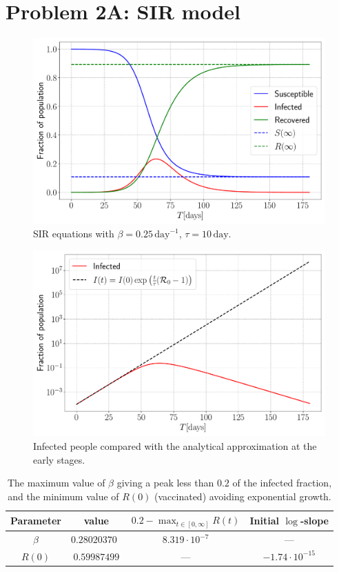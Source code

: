 \section{Problem 2A: SIR model}

\begin{figure}[htb]
	\centering
	\includegraphics[width=0.8\columnwidth]{../fig/2Aa_SIR.pdf}
	\caption{SIR equations with $\beta = 0.25 \, \mathrm{day}^{-1}$, $\tau = 10 \, \mathrm{day}$.}
	\label{fig:SIR}
\end{figure}

\begin{figure}[htb]
	\centering
	\includegraphics[width=0.8\columnwidth]{../fig/2Ab_I.pdf}
	\caption{Infected people compared with the analytical approximation at the early stages.}
	\label{fig:Infected}
\end{figure}



\begin{table}[htb]
	\centering
	\caption{The maximum value of $\beta$ giving a peak less than $0.2$ of the infected fraction, and the minimum value of $R(0)$ (vaccinated) avoiding exponential growth.}
	\begin{tabular}{cccc}
		\toprule
		Parameter & value & $0.2 - \max_{t\in[0,\infty]} R(t)$ & Initial $\log$-slope \\
		\midrule
		$\beta$ & $0.28020370$ & $8.319\cdot 10^{-7}$ & --- \\
		$R(0)$  & $0.59987499$ & --- & $-1.74\cdot 10^{-15}$ \\
		\bottomrule
	\end{tabular}
\end{table}

